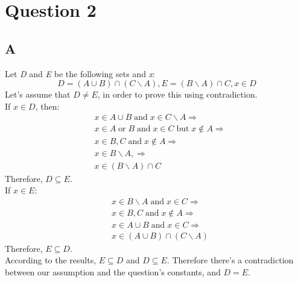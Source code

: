 \documentclass[12pt, oneside]{article}
\begin{document}
\section{Question 2}
\subsection{A}
Let \emph{D} and \emph{E} be the following sets and \emph{x}:
\begin{equation*}
D = (A \cup B) \cap (C \backslash A), E = (B \backslash A) \cap C, x \in D
\end{equation*}
Let's assume that $D \neq E$, in order to prove this using contradiction.\\
If $x \in D$, then:
\begin{equation*}
\begin{split}
& x \in A \cup B\;\text{and}\;x \in C \backslash A \Rightarrow \\
& x \in A\;\text{or}\;B\;\text{and}\;x \in C\;\text{but}\;x \not\in A \Rightarrow \\
& x \in B, C\;\text{and}\; x \not\in A\Rightarrow \\
& x \in B \backslash A, \Rightarrow \\
& x \in (B \backslash A) \cap C
\end{split}
\end{equation*}
Therefore, $D \subseteq E$.\\
If $x \in E$:
\begin{equation*}
\begin{split}
& x \in B \backslash A\;\text{and}\;x \in C \Rightarrow \\
& x \in B, C\;\text{and}\;x \not\in A \Rightarrow \\
& x \in A \cup B\;\text{and}\;x \in C \Rightarrow \\
& x \in (A \cup B) \cap (C \backslash A)
\end{split}
\end{equation*}
Therefore, $E \subseteq D$.\\
According to the results, $E \subseteq D$ and $D \subseteq E$. Therefore there's a contradiction between our assumption and the question's constants, and $D = E$.
\end{document}
